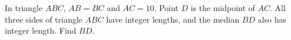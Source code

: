 In triangle $ABC$, $AB=BC$ and $AC=10$. Point $D$ is the midpoint of $AC$. All three sides of triangle $ABC$ have integer lengths, and the median $BD$ also has integer length. Find $BD$.
